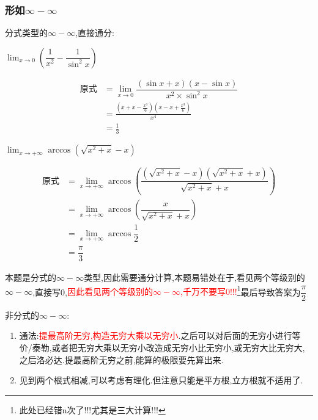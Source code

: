 \documentclass[8pt a4paper, oneside, UTF8]{ctexbook}
\begin{document}
\begin{sloppypar}
    \subsubsection{形如$\infty -\infty$}
    分式类型的$\infty -\infty$,直接通分:
    \begin{problem}
        $\lim_{x\to 0}\left(\dfrac{1}{x^2}-\dfrac{1}{\sin ^2 x}\right)$        
    \end{problem}
    \begin{solution}
        \begin{align*}
          \text{原式} & =\lim_{x\to 0}\dfrac{(\sin x +x)(x- \sin x)}{x^2 \times \sin^2 x}\\
          & = \frac{(x+x-\frac{x^3}{6})(x-x+\frac{x^3}{6})}{x^4}\\
          & = \frac{1}{3}
        \end{align*}
    \end{solution}
    \begin{problem}
        $\lim_{x \to +\infty} \arccos \left( \sqrt{x^2+x} -x \right)$
    \end{problem}
    \begin{solution}
            \begin{align*}
              \text{原式} & = \lim_{x \to +\infty} \arccos \left( \dfrac{(\sqrt{x^2+x}-x)(\sqrt{x^2+x}+x)}{\sqrt{x^2+x}+x} \right)  \\
              & =  \lim_{x \to +\infty} \arccos \left( \dfrac{x}{\sqrt{x^2+x}+x} \right)  \\
              & =  \lim_{x \to +\infty} \arccos \dfrac{1}{2} \\
              & = \dfrac{\pi}{3}
            \end{align*}
    \end{solution}
    \begin{note}
        本题是分式的$\infty-\infty$类型,因此需要通分计算,本题易错处在于,看见两个等级别的$\infty-\infty$,直接写0,\textcolor{red}{因此看见两个等级别的$\infty-\infty$,千万不要写0!!!}\footnote{此处已经错n次了!!!尤其是三大计算!!!}最后导致答案为$\dfrac{\pi}{2}$
    \end{note}
    非分式的$\infty -\infty$:
    \begin{enumerate}
        \item 通法:\textcolor{red}{提最高阶无穷,构造无穷大乘以无穷小}.之后可以对后面的无穷小进行等价/泰勒,或者把无穷大乘以无穷小改造成无穷小比无穷小,或无穷大比无穷大,之后洛必达.提最高阶无穷之前,能算的极限要先算出来.
        \item 见到两个根式相减,可以考虑有理化.但注意只能是平方根,立方根就不适用了.

\end{enumerate}
\end{sloppypar}
\end{document}
